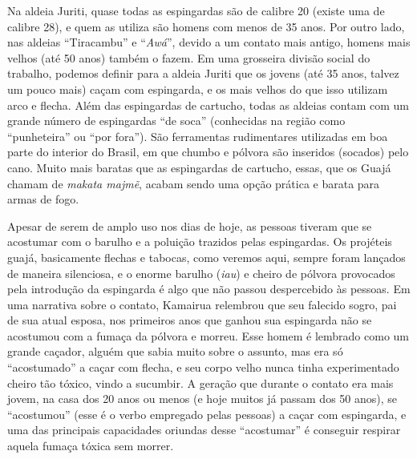 Na aldeia Juriti, quase todas as espingardas são de calibre 20 (existe
uma de calibre 28), e quem as utiliza são homens com menos de 35 anos.
Por outro lado, nas aldeias ``Tiracambu'' e ``\emph{Awá}'', devido a um
contato mais antigo, homens mais velhos (até 50 anos) também o fazem. Em
uma grosseira divisão social do trabalho, podemos definir para a aldeia
Juriti que os jovens (até 35 anos, talvez um pouco mais) caçam com
espingarda, e os mais velhos do que isso utilizam arco e flecha. Além
das espingardas de cartucho, todas as aldeias contam com um grande
número de espingardas ``de soca'' (conhecidas na região como
``punheteira'' ou ``por fora''). São ferramentas rudimentares utilizadas
em boa parte do interior do Brasil, em que chumbo e pólvora são
inseridos (socados) pelo cano. Muito mais baratas que as espingardas de
cartucho, essas, que os Guajá chamam de \emph{makata majmẽ}, acabam
sendo uma opção prática e barata para armas de fogo.

Apesar de serem de amplo uso nos dias de hoje, as pessoas tiveram que se
acostumar com o barulho e a poluição trazidos pelas espingardas. Os
projéteis guajá, basicamente flechas e tabocas, como veremos aqui,
sempre foram lançados de maneira silenciosa, e o enorme barulho
(\emph{iau}) e cheiro de pólvora provocados pela introdução da
espingarda é algo que não passou despercebido às pessoas. Em uma
narrativa sobre o contato, Kamairua relembrou que seu falecido sogro,
pai de sua atual esposa, nos primeiros anos que ganhou sua espingarda
não se acostumou com a fumaça da pólvora e morreu. Esse homem é lembrado
como um grande caçador, alguém que sabia muito sobre o assunto, mas era
só ``acostumado'' a caçar com flecha, e seu corpo velho nunca tinha
experimentado cheiro tão tóxico, vindo a sucumbir. A geração que durante
o contato era mais jovem, na casa dos 20 anos ou menos (e hoje muitos já
passam dos 50 anos), se ``acostumou'' (esse é o verbo empregado pelas
pessoas) a caçar com espingarda, e uma das principais capacidades
oriundas desse ``acostumar'' é conseguir respirar aquela fumaça tóxica
sem morrer.

